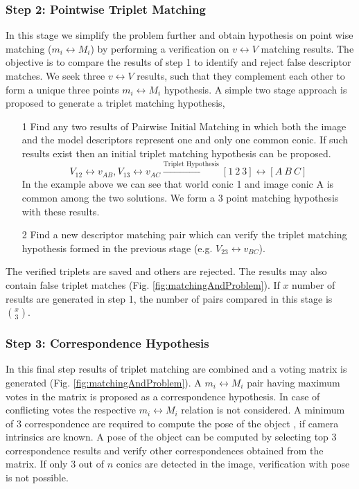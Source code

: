 \documentclass{bmvc2k}
\begin{document}
\subsubsection{Step 2: Pointwise Triplet Matching}
In this stage we simplify the problem further and obtain hypothesis on point wise matching ($ m_i \leftrightarrow M_i $) by performing a verification on $ v \leftrightarrow V $ matching results. 
The objective is to compare the results of step 1 to identify and reject false descriptor matches. 
We seek three $ v \leftrightarrow V $ results, such that they complement each other to form a unique three points $ m_i \leftrightarrow M_i $ hypothesis.
A simple two stage approach is proposed to generate a triplet matching hypothesis,
\begin{enumerate}
\item[1] Find any two results of Pairwise Initial Matching in which both the image and the model descriptors represent one and only one common conic. If such results exist then an initial triplet matching hypothesis can be proposed. 
\[
 V_{12} \leftrightarrow v_{AB},V_{13} \leftrightarrow v_{AC } \xrightarrow{\text{Triplet Hypothesis}} [1~2~3] \leftrightarrow [A~B~ C]
\]
In the example above we can see that world conic 1 and image conic A is common among the two solutions. We form a 3 point matching hypothesis with these results. 
\item[2] Find a new descriptor matching pair which can verify the triplet matching hypothesis formed in the previous stage (e.g. $ V_{23} \leftrightarrow v_{BC}$).
\end{enumerate}
The verified triplets are saved and others are rejected. 
The results may also contain false triplet matches (Fig. \ref{fig:matchingAndProblem}). 
If $ x $ number of results are generated in step 1, the number of pairs compared in this stage is $ \binom{x}{3} $. 

\subsubsection{Step 3: Correspondence Hypothesis }
\label{subSec:CHypo}
In this final step results of triplet matching are combined and a voting matrix is generated (Fig. \ref{fig:matchingAndProblem}). 
A $ m_i \leftrightarrow M_i $ pair having maximum votes in the matrix is proposed as a correspondence hypothesis. 
In case of conflicting votes the respective $ m_i \leftrightarrow M_i $ relation is not considered. 
A minimum of 3 correspondence are required to compute the pose of the object \cite{lepetit_monocular_2005}, if camera intrinsics are known. 
A pose of the object can be computed by selecting top 3 correspondence results and verify other correspondences obtained from the matrix. 
If only 3 out of $ n $ conics are detected in the image, verification with pose is not possible. 
\end{document}
